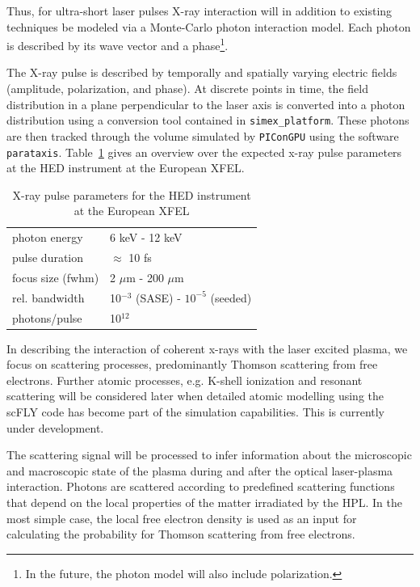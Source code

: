 \documentclass[10pt]{scrartcl}
\begin{document}
Thus, for ultra-short laser pulses X-ray interaction will in addition to existing
techniques be modeled via a Monte-Carlo photon interaction model. Each photon is
described by its wave vector and a phase\footnote{In the future, the photon model
will also include polarization.}.

The X-ray pulse is described by temporally and spatially varying electric fields
(amplitude, polarization, and phase). At discrete points in time, the field
distribution in a plane perpendicular to the laser axis is converted into a
photon distribution using a conversion tool contained in
\texttt{simex\_platform}. These photons are then tracked through the volume simulated by
\texttt{PIConGPU} using the software \texttt{parataxis}.
Table~\ref{tab:xfel_sase2} gives an overview over the expected x-ray pulse
parameters at the HED instrument at the European XFEL.

\begin{table}[h]
  \centering
  \begin{tabular}{l|l}
    \hline
    \hline
    photon energy &  6 keV - 12 keV \\
    pulse duration & $\approx$ 10 fs \\
    focus size (fwhm) & 2 $\mu\text{m}$ - 200 $\mu\text{m}$\\
    rel. bandwidth & 10$^{-3}$ (SASE) - $10^{-5}$ (seeded)\\
    photons/pulse & 10$^{12}$\\
    \hline
    \hline
  \end{tabular}
  \caption{X-ray pulse parameters for the HED instrument at the European XFEL}
  \label{tab:xfel_sase2}
\end{table}

In describing the interaction of coherent x-rays with the laser excited plasma,
we focus on scattering processes, predominantly Thomson scattering from free
electrons. Further atomic processes, e.g. K-shell ionization and resonant
scattering will be considered later when detailed atomic modelling using the
scFLY code \cite{Chung2007} has become part of the simulation capabilities. This is
currently under development.

The scattering signal will be processed to
infer information about the microscopic and macroscopic state of the plasma
during and after the optical laser-plasma interaction.  Photons are scattered
according to predefined scattering functions that depend on the local properties
of the matter irradiated by the HPL. In the most simple case, the local free
electron density is used as an input for calculating the probability for Thomson
scattering from free electrons.
\end{document}
